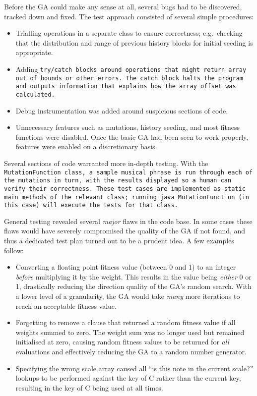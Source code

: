 Before the GA could make any sense at all, several bugs had to be discovered, tracked down and
fixed. The test approach consisted of several simple procedures:
\begin{itemize}
\item Trialling operations in a separate class to ensure correctness; e.g.\ checking that the
distribution and range of previous history blocks for initial seeding is appropriate.
\item Adding \tt{try}/\tt{catch} blocks around operations that might return array out of bounds
or other errors. The \tt{catch} block halts the program and outputs information that explains how
the array offset was calculated.
\item Debug instrumentation was added around suspicious sections of code.
\item Unnecessary features such as mutations, history seeding, and most fitness functions were
disabled. Once the basic GA had been seen to work properly, features were enabled on a discretionary
basis.
\end{itemize}

Several sections of code warranted more in-depth testing. With the \tt{MutationFunction} class,
a sample musical phrase is run through each of the mutations in turn, with the results displayed
so a human can verify their correctness. These test cases are implemented as
static \tt{main} methods of the relevant class; running \tt{java MutationFunction} (in this case)
will execute the tests for that class.

General testing revealed several \emph{major} flaws in the code base. In some cases these flaws
would have severely compromised the quality of the GA if not found, and thus a dedicated test plan
turned out to be a prudent idea. A few examples follow:
\begin{itemize}
\item Converting a floating point fitness value (between 0 and 1) to an integer \emph{before} multiplying
it by the weight. This results in the value being \emph{either} 0 or 1, drastically reducing the
direction quality of the GA's random search. With a lower level of a granularity, the GA would take
\emph{many} more iterations to reach an acceptable fitness value.
\item Forgetting to remove a clause that returned a random fitness value if all weights summed to zero.
The weight sum was no longer used but remained initialised at zero, causing random fitness values to
be returned for \emph{all} evaluations and effectively reducing the GA to a random number generator.
\item Specifying the wrong scale array caused all ``is this note in the current scale?'' lookups to be performed
against the key of C rather than the current key, resulting in the key of C being used at all times.
\end{itemize}

